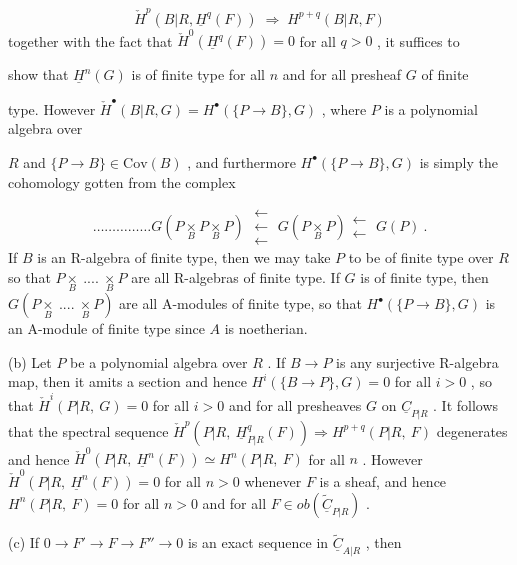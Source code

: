 \begin{equation*}
\check{H}^{p}(B|R,\underline{H}^{q}(F)) \;\Rightarrow\; H^{p+q}(B|R,F)
\end{equation*}
together with the fact that  $\check{H}^{0}(\underline{H}^{q}(F)) = 0$  for all  $q > 0$  , it suffices to

show that  $\underline{H}^{n}(G)$  is of finite type for all  $n$  and for all presheaf  $G$  of finite

type. However  $\check{H}^{\bullet}(B|R,G) = H^{\bullet}(\{P \to B\},G)$  , where  $P$  is a polynomial algebra over

$R$  and  $\{P \to B\} \in \mathrm{Cov}(B)$  , and furthermore  $H^{\bullet}(\{P \to B\},G)$  is simply the
cohomology gotten from the complex

\begin{equation*}
\dots\dots\dots\dots\dots G(P \underset{B}{\times} P \underset{B}{\times} P) \;\substack{\longleftarrow\\ \longleftarrow\\ \longleftarrow}\; G(P \underset{B}{\times} P) \substack{\longleftarrow\\ \longleftarrow}\; G(P) \ .
\end{equation*}
If  $B$  is an R-algebra of finite type, then we may take  $P$  to be of finite type over  $R$  so that  $P\underset{B}{\times}\ ....\ \underset{B}{\times}P$  are all R-algebras of finite type. If  $G$  is of finite type, then  $G(P\underset{B}{\times}\ ....\ \underset{B}{\times}P)$  are all A-modules of finite type, so that  $H^{\bullet}(\{P \to B\},G)$  is an A-module of finite type since  $A$  is noetherian.

(b)  Let  $P$  be a polynomial algebra over  $R$ . If  $B \to P$  is any surjective R-algebra map, then it amits a section and hence  $H^{i}(\{B \to P\},G) = 0$  for all  $i > 0$ , so that  $\check{H}^{i}(P|R,\ G) = 0$  for all  $i > 0$  and for all presheaves  $G$  on  $\underline{C}_{P|R}$ . It follows that the spectral sequence  $\check{H}^{p}(P|R,\ \underline{H}^{q}_{P|R}(F)) \Rightarrow H^{p+q}(P|R,\ F)$  degenerates and hence  $\check{H}^{0}(P|R,\ \underline{H}^{n}(F)) \simeq H^{n}(P|R,\ F)$  for all  $n$ . However  $\check{H}^{0}(P|R,\ \underline{H}^{n}(F)) = 0$  for all  $n > 0$  whenever  $F$  is a sheaf, and hence  $H^{n}(P|R,\ F) = 0$  for all  $n > 0$  and for all  $F \in ob(\widetilde{\underline{C}}_{P|R})$ .

(c)  If  $0 \to F' \to F \to F'' \to 0$  is an exact sequence in  $\widetilde{\underline{C}}_{A|R}$ , then

